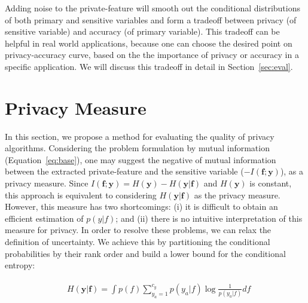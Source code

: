 \documentclass[10pt,journal,compsoc]{IEEEtran}
\begin{document}
Adding noise to the private-feature will smooth out the conditional distributions of both primary and sensitive variables and form a tradeoff between privacy (of sensitive variable) and accuracy (of primary variable). This tradeoff can be helpful in real world applications, because one can choose the desired point on privacy-accuracy curve, based on the the importance of privacy or accuracy in a specific application. We will discuss this tradeoff in detail in Section~\ref{sec:eval}.


\section{Privacy Measure}\label{sec:privacy}%

In this section, we propose a method for evaluating the quality of privacy algorithms. Considering the problem formulation by mutual information (Equation~\ref{eq:base}), one may suggest the negative of mutual information between the extracted private-feature and the sensitive variable ($-I(\textbf{f};\textbf{y})$), as a privacy measure. Since $I(\textbf{f};\textbf{y})=H(\textbf{y}) - H(\textbf{y}|\textbf{f})$ and $H(\textbf{y})$ is constant, this approach is equivalent to considering $H(\textbf{y}|\textbf{f})$ as the privacy measure. However, this measure has two shortcomings: (i) it is difficult to obtain an efficient estimation of $p(y|f)$; and (ii) there is no intuitive interpretation of this measure for privacy. In order to resolve these problems, we can relax the definition of uncertainty. We achieve this by partitioning the conditional probabilities by their rank order and build a lower bound for the conditional entropy:

\begin{align*}
\begin{split}
& H(\textbf{y}|\textbf{f}) = \int p(f) \sum_{y_a=1}^{c_y} p(y_a|f) \log \frac{1}{p(y_a|f)} df %
\end{split}
\end{align*}%
\end{document}
